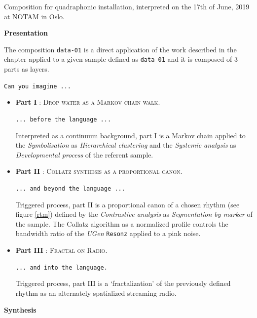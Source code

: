\bigskip

Composition for quadraphonic installation, interpreted on the 17th of June, 2019 at NOTAM in Oslo.

\bigskip

\noindent \textbf{{\large Presentation}}
\hrulefill

\bigskip

The composition \texttt{data-01} is a direct application of the work described in the chapter \textsl{} applied to a given sample defined as \texttt{data-01} and it is composed of 3 parts as layers.

\bigskip

\texttt{Can you imagine ...} 

\begin{itemize}[leftmargin=0.4in]
\item \textbf{Part I} : \textsc{Drop water as a Markov chain walk}. 

\texttt{... before the language ...} 

Interpreted as a continuum background, part I is a Markov chain applied to the \textsl{Symbolisation} as \textsl{Hierarchical clustering} and the \textsl{Systemic analysis} as \textsl{Developmental process} of the referent sample.

\item \textbf{Part II} : \textsc{Collatz synthesis as a proportional canon}. 

\texttt{... and beyond the language ...} 

Triggered process, part II is a proportional canon of a chosen rhythm (see figure \ref{rtm}) defined by the \textsl{Contrastive analysis} as \textsl{Segmentation by marker} of the sample. The Collatz algorithm as a normalized profile controls the bandwidth ratio of the \textsl{UGen} \texttt{Resonz} applied to a pink noise.

\item \textbf{Part III} : \textsc{Fractal on Radio}. 

\texttt{... and into the language.} 

Triggered process, part III is a `fractalization' of the previously defined rhythm as an alternately spatialized streaming radio.

 \end{itemize}

\smallskip

\noindent \textbf{{\large Synthesis}}
\hrulefill

\bigskip

